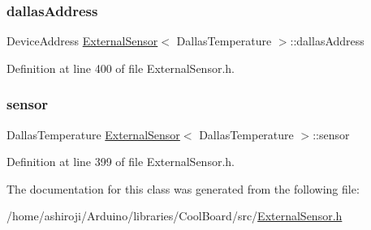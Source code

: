 \subsubsection{\texorpdfstring{dallas\+Address}{dallasAddress}}
{\footnotesize\ttfamily Device\+Address \hyperlink{class_external_sensor}{External\+Sensor}$<$ Dallas\+Temperature $>$\+::dallas\+Address\hspace{0.3cm}{\ttfamily [private]}}



Definition at line 400 of file External\+Sensor.\+h.

\mbox{\label{class_external_sensor_3_01_dallas_temperature_01_4_adb6ba4fcdedef95ad8f6b0c9b6c0f9d1}} 
\subsubsection{\texorpdfstring{sensor}{sensor}}
{\footnotesize\ttfamily Dallas\+Temperature \hyperlink{class_external_sensor}{External\+Sensor}$<$ Dallas\+Temperature $>$\+::sensor\hspace{0.3cm}{\ttfamily [private]}}



Definition at line 399 of file External\+Sensor.\+h.



The documentation for this class was generated from the following file\+:\begin{DoxyCompactItemize}
\item 
/home/ashiroji/\+Arduino/libraries/\+Cool\+Board/src/\hyperlink{_external_sensor_8h}{External\+Sensor.\+h}\end{DoxyCompactItemize}

